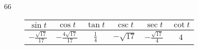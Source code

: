 \documentclass{exam}
\begin{document}
\begin{description}
      \item[66]
        \begin{tabular}[H]{cccccc}
          \toprule
          $\sin t$                & $\cos t$                  & $\tan t$      & $\csc t$     & $\sec t$               & $\cot t$ \\
          \midrule
          $-\frac{\sqrt{17}}{17}$ & $-\frac{4 \sqrt{17}}{17}$ & $\frac{1}{4}$ & $-\sqrt{17}$ & $-\frac{\sqrt{17}}{4}$ & $4$ \\
          \bottomrule
        \end{tabular}








\end{description}
\end{document}
